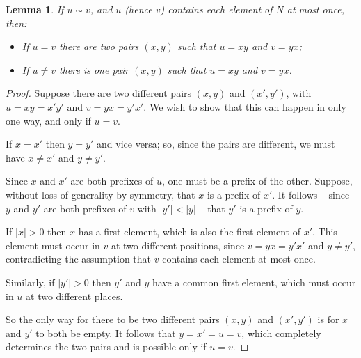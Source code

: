 \documentclass[a4paper]{article}
\newtheorem{lemma}{Lemma}
\theoremstyle{definition}
\theoremstyle{remark}
\begin{document}
\begin{lemma}\label{lem:aperiodic}
    If $u\sim v$, and $u$ (hence $v$) contains each element of $N$ at most once, then:
    \begin{itemize}
        \item If $u=v$ there are two pairs $(x, y)$ such that $u=xy$ and $v=yx$;
        \item If $u\ne v$ there is one pair $(x, y)$ such that $u=xy$ and $v=yx$.
    \end{itemize}
\end{lemma}
\begin{proof}
    Suppose there are two different pairs $(x, y)$ and $(x', y')$, with $u=xy=x'y'$ and $v=yx=y'x'$. We wish to show that this can happen in only one way, and only if $u=v$.

    If $x=x'$ then $y=y'$ and vice versa; so, since the pairs are different, we must have $x\ne x'$ and $y\ne y'$.

    Since $x$ and $x'$ are both prefixes of $u$, one must be a prefix of the other. Suppose, without loss of generality by symmetry, that $x$ is a prefix of $x'$. It follows -- since $y$ and $y'$ are both prefixes of $v$ with $|y'|<|y|$ -- that $y'$ is a prefix of $y$.

    If $|x|>0$ then $x$ has a first element, which is also the first element of $x'$. This element must occur in $v$ at two different positions, since $v=yx=y'x'$ and $y\ne y'$, contradicting the assumption that $v$ contains each element at most once.

    Similarly, if $|y'|>0$ then $y'$ and $y$ have a common first element, which must occur in $u$ at two different places.

    So the only way for there to be two different pairs $(x, y)$ and $(x', y')$ is for $x$ and $y'$ to both be empty. It follows that $y=x'=u=v$, which completely determines the two pairs and is possible only if $u=v$.
\end{proof}
\end{document}
